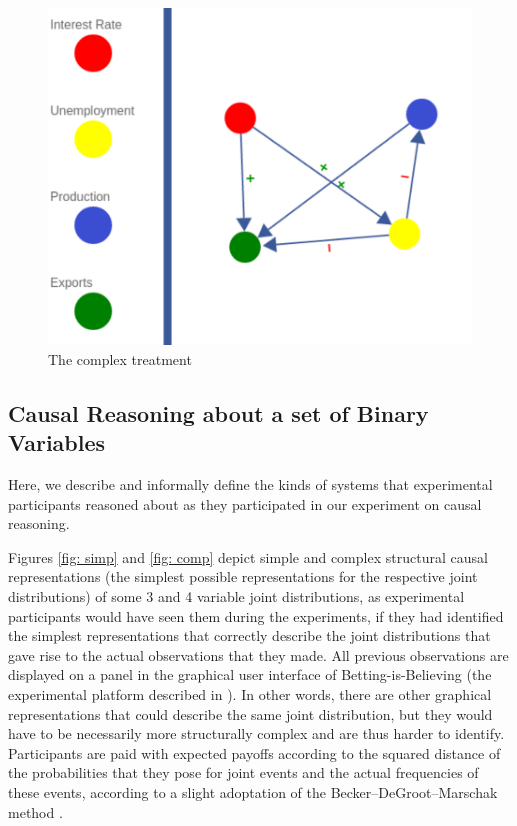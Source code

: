 \begin{figure}[h!]
\begin{center}
\includegraphics[width=12cm]{figures/Complex.pdf}
\caption{\footnotesize{The complex treatment}}
\label{fig:comp}
\end{center}
\end{figure}



\subsection{Causal Reasoning about a set of Binary Variables}

Here, we describe and informally define the kinds of systems that experimental participants reasoned about as they participated in our experiment on causal reasoning. 


Figures \ref{fig: simp} and \ref{fig: comp} depict simple and complex structural causal representations (the simplest possible representations for the respective joint distributions) of some 3 and 4 variable joint distributions, as experimental participants would have seen them during the experiments, if they had identified the simplest representations that correctly describe the joint distributions that gave rise to the actual observations that they made. All previous observations are displayed on a panel in the graphical user interface of Betting-is-Believing (the experimental platform described in \cite{castnerForthcoming}).  In other words, there are other graphical representations that could describe the same joint distribution, but they would have to be necessarily more structurally complex and are thus harder to identify. Participants are paid with expected payoffs according to the squared distance of the probabilities that they pose for joint events and the actual frequencies of these events, according to a slight adoptation of the Becker–DeGroot–Marschak method \cite{becker1964measuring, Moldovanu98}.
       
